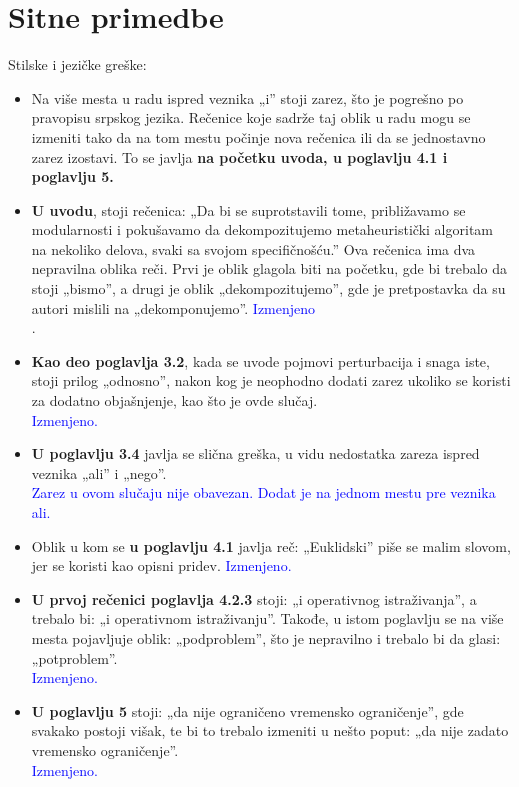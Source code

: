 \documentclass[a4paper]{report}
\newcommand{\odgovor}[1]{\textcolor{blue}{#1}}
\begin{document}
\section{Sitne primedbe}
Stilske i jezičke greške:
\begin{itemize}
 \item Na više mesta u radu ispred veznika „i” stoji zarez, što je pogrešno po pravopisu srpskog jezika. Rečenice koje sadrže taj oblik u radu mogu se izmeniti tako da na tom mestu počinje nova rečenica ili da se jednostavno zarez izostavi. To se javlja \textbf{na početku uvoda, u poglavlju 4.1 i poglavlju 5.}
 
 \item \textbf{U uvodu}, stoji rečenica: „Da bi se suprotstavili tome, približavamo se modularnosti i pokušavamo da dekompozitujemo metaheuristički algoritam na nekoliko delova, svaki sa svojom specifičnošću.” Ova rečenica ima dva nepravilna oblika reči. Prvi je oblik glagola biti na početku, gde bi trebalo da stoji „bismo”, a drugi je oblik „dekompozitujemo”, gde je pretpostavka da su autori mislili na „dekomponujemo”.
 \odgovor{Izmenjeno\\}.
 
 \item \textbf{Kao deo poglavlja 3.2}, kada se uvode pojmovi perturbacija i snaga iste, stoji prilog „odnosno”, nakon kog je neophodno dodati zarez ukoliko se koristi za dodatno objašnjenje, kao što je ovde slučaj.\\
 \odgovor{Izmenjeno.\\}
 
 \item \textbf{U poglavlju 3.4} javlja se slična greška, u vidu nedostatka zareza ispred veznika „ali” i „nego”.\\
 \odgovor{Zarez u ovom slučaju nije obavezan. Dodat je na jednom mestu pre veznika ali.\\}
 
 \item Oblik u kom se \textbf{u poglavlju 4.1} javlja reč: „Euklidski” piše se malim slovom, jer se koristi kao opisni pridev.
 \odgovor{Izmenjeno.\\}
 \item \textbf{U prvoj rečenici poglavlja 4.2.3} stoji: „i operativnog istraživanja”, a trebalo bi: „i operativnom istraživanju”. Takođe, u istom poglavlju se na više mesta pojavljuje oblik: „podproblem”, što je nepravilno i trebalo bi da glasi: „potproblem”.\\
\odgovor{Izmenjeno.\\}
 
 \item \textbf{U poglavlju 5} stoji: „da nije ograničeno vremensko ograničenje”, gde svakako postoji višak, te bi to trebalo izmeniti u nešto poput: „da nije zadato vremensko ograničenje”.\\
\odgovor{Izmenjeno.\\}
\end{itemize}
\end{document}
